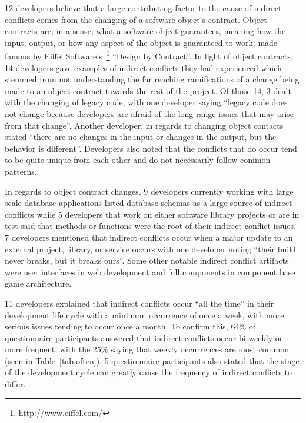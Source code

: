 12 developers believe that a large contributing factor to the cause
of indirect conflicts comes from the changing of a software object's contract. Object contracts are, in a sense,
what a software object guarantees, meaning how the input, output, or how any aspect of the object is guaranteed
to work; made famous by Eiffel Software's~\footnote{http://www.eiffel.com/} ``Design by Contract''\texttrademark.
In light of object contracts, 14 developers gave examples of indirect conflicts they had experienced
which stemmed from not understanding the far reaching ramifications of a change being made to an object contract
towards the rest of the project. Of those 14, 3 dealt
with the changing of legacy code, with one developer saying ``legacy code does not change because developers
are afraid of the long range issues that may arise from that change''. Another developer, in regards to changing
object contacts stated ``there are no changes in the input or changes in the output, but the behavior is different''.
Developers also noted that the conflicts that do occur tend to be quite unique from each other and do not necessarily
follow common patterns.

In regards to object contract changes, 9 developers currently working with large scale database applications listed database
schemas as a large source of indirect conflicts while 5 developers that work on either software
library projects or are in test said that methods or functions were the root of their indirect conflict issues.
7 developers mentioned that indirect conflicts occur when a major update to an external project,
library, or service occurs with one developer noting ``their build never breaks, but it breaks ours''. Some
other notable indirect conflict artifacts were user interfaces in web development and full components in component
base game architecture.

11 developers explained that indirect conflicts occur ``all the time'' in
their development life cycle with a minimum occurrence of once a week, with more serious issues tending
to occur once a month. To confirm this, 64\% of questionnaire participants answered that indirect conflicts occur bi-weekly or more
frequent,
with the 25\% saying that weekly occurrences are most common (seen in Table~\ref{tab:often}). 5 questionnaire participants
also stated that the stage of the development cycle can greatly cause the frequency of indirect conflicts to
differ.

